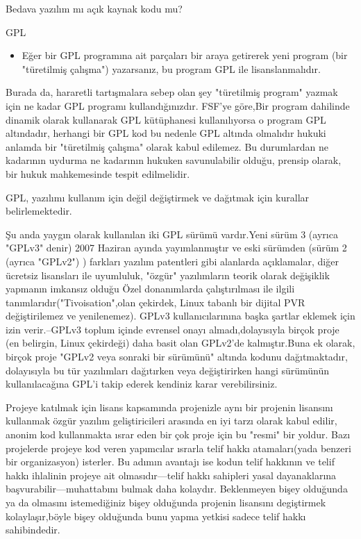 \documentclass[10pt,a5paper]{book}
\begin{document}
\begin{section}{Bedava yazılım mı açık kaynak kodu mu?}
\begin{subsection}{GPL}
\begin{itemize}
Eğer biri para ile GPL yazılım satın alırsa, doğal olarak sadece bütün bilgisayarlarında çalıştırma hakkına sahiptir, kopyalayamaz ve yeniden satamaz.(GPL lisansı altında).Bunun bir sonucu olarak da "koltuk başına" GPL yazılım satmak  mantıklı bir iş değildir, bu durumun önemli bir sonucu olarakta fiyatlar açısından rahatlık sağlamasıdır bu sebeple Linux dağıtımları kullanmak mantıklıdır.

 \item Eğer bir GPL programına ait parçaları bir araya getirerek yeni program (bir "türetilmiş çalışma") yazarsanız, bu program GPL ile lisanslanmalıdır.
\end{itemize}

Burada da, hararetli tartışmalara sebep olan şey "türetilmiş program" yazmak için ne kadar GPL programı kullandığınızdır. FSF'ye göre,Bir program dahilinde dinamik olarak kullanarak GPL kütüphanesi kullanılıyorsa o program GPL altındadır, herhangi bir GPL kod  bu nedenle GPL altında olmalıdır hukuki anlamda bir "türetilmiş çalışma" olarak kabul edilemez. Bu durumlardan ne kadarının uydurma ne kadarının hukuken savunulabilir olduğu, prensip olarak, bir hukuk mahkemesinde tespit edilmelidir.

GPL, yazılımı kullanım için değil değiştirmek ve dağıtmak için kurallar belirlemektedir.

Şu anda  yaygın olarak kullanılan  iki GPL sürümü vardır.Yeni sürüm 3 (ayrıca "GPLv3" denir)  2007 Haziran ayında yayımlanmıştır ve eski sürümden (sürüm 2 (ayrıca "GPLv2") ) farkları yazılım patentleri gibi alanlarda açıklamalar, diğer ücretsiz lisansları ile uyumluluk, "özgür" yazılımların teorik olarak değişiklik yapmanın imkansız olduğu Özel donanımlarda çalıştırılması ile ilgili tanımlarıdır("Tivoisation",olan çekirdek, Linux tabanlı bir dijital PVR değiştirilemez ve yenilenemez). GPLv3 kullanıcılarınına başka şartlar eklemek için izin verir.--GPLv3 toplum içinde evrensel onayı almadı,dolayısıyla birçok proje (en belirgin, Linux çekirdeği) daha basit  olan GPLv2'de kalmıştır.Buna ek olarak, birçok proje "GPLv2 veya sonraki bir sürümünü" altında kodunu dağıtmaktadır, dolayısıyla bu tür yazılımları dağıtırken veya değiştirirken hangi sürümünün kullanılacağına GPL'i takip ederek kendiniz karar verebilirsiniz.

Projeye katılmak için  lisans kapsamında projenizle aynı bir projenin lisansını kullanmak özgür yazılım geliştiricileri arasında en iyi tarzı olarak kabul edilir, anonim kod  kullanmakta ısrar eden  bir çok proje için bu  "resmi" bir yoldur. Bazı projelerde projeye kod veren yapımcılar ısrarla telif hakkı atamaları(yada benzeri bir organizasyon) isterler. Bu adımın avantajı ise kodun telif hakkının ve telif hakkı ihlalinin projeye ait olmasıdır—telif hakkı sahipleri yasal dayanaklarına başvurabilir—muhattabını bulmak daha kolaydır. Beklenmeyen bişey olduğunda ya da olmasını istemediğiniz bişey olduğunda projenin lisansını degiştirmek kolaylaşır,böyle bişey olduğunda bunu yapma yetkisi sadece telif hakkı sahibindedir.


\end{subsection}
\end{section}
\end{document}
